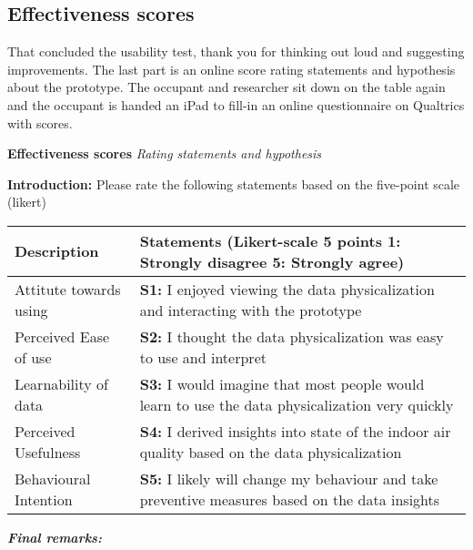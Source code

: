 \begin{appendices}
\section{Effectiveness scores}
\label{appendix:effectiveness}

That concluded the usability test, thank you for thinking out loud and suggesting improvements. The last part is an online score rating statements and hypothesis about the prototype. The occupant and researcher sit down on the table again and the occupant is handed an iPad to fill-in an online questionnaire on Qualtrics with scores.

\vspace{5pt}

\begin{table}[htbp]
    \captionsetup{justification=raggedright,singlelinecheck=false}
    \raggedright \textbf{Effectiveness scores} \textit{Rating statements and hypothesis} \\
    \label{tab:column_widths}
    \raggedright \textbf{Introduction:} Please rate the following statements based on the five-point scale (likert)
    \begin{tabularx}{\textwidth}{|p{}|X|}
        \hline
        \textbf{Description} & \textbf{Statements (Likert-scale 5 points 1: Strongly disagree 5: Strongly agree)} \\
        \hline        
        \hline
        Attitute towards using & \textbf{S1:} I enjoyed viewing the data physicalization and interacting with the prototype \\
        \hline
        Perceived Ease of use & \textbf{S2:} I thought the data physicalization was easy to use and interpret \\
        \hline
        Learnability of data & \textbf{S3:} I would imagine that most people would learn to use the data physicalization very quickly \\
        \hline
        Perceived Usefulness & \textbf{S4:} I derived insights into state of the indoor air quality based on the data physicalization \\
        \hline
        Behavioural Intention & \textbf{S5:} I likely will change my behaviour and take preventive measures based on the data insights \\        
        \hline
    \end{tabularx}
\end{table}

\textit{\textbf{Final remarks:}}


\end{appendices}

